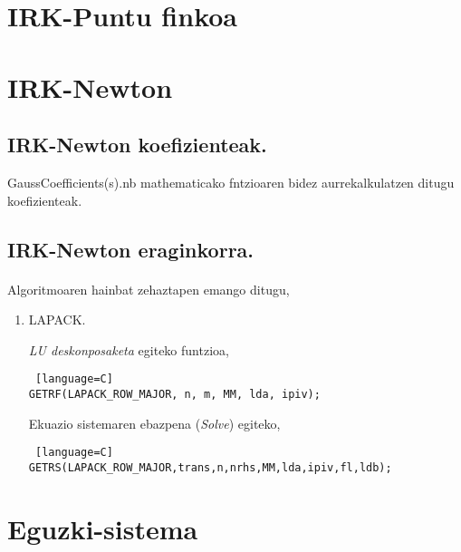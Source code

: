 \section{IRK-Puntu finkoa}

\section{IRK-Newton}


\subsection{IRK-Newton koefizienteak.}

GaussCoefficients(s).nb mathematicako fntzioaren bidez aurrekalkulatzen ditugu koefizienteak.

\subsection{IRK-Newton eraginkorra.}

\paragraph*{} Algoritmoaren hainbat zehaztapen emango ditugu,

\begin{enumerate}

\item LAPACK.

\emph{LU deskonposaketa} egiteko funtzioa,
\begin{lstlisting} [language=C]
GETRF(LAPACK_ROW_MAJOR, n, m, MM, lda, ipiv);
\end{lstlisting}

Ekuazio sistemaren ebazpena (\emph{Solve}) egiteko,
\begin{lstlisting} [language=C]
GETRS(LAPACK_ROW_MAJOR,trans,n,nrhs,MM,lda,ipiv,fl,ldb);
\end{lstlisting}

\end{enumerate}

\section{Eguzki-sistema}

